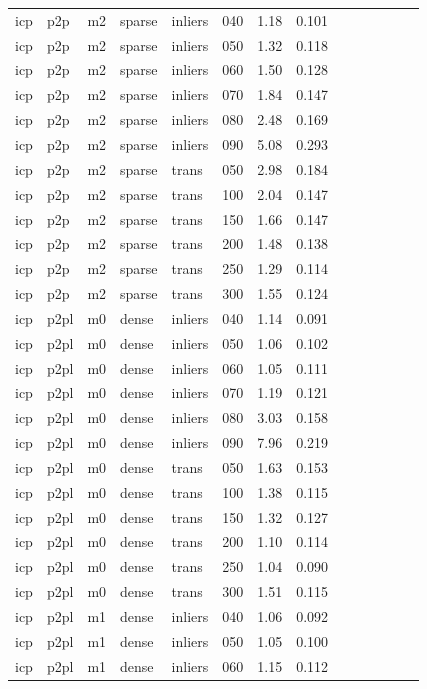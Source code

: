 \begin{table}[htbp]
\begin{tabular}{llllllrrrrrrrr}
  icp & p2p & m2 & sparse & inliers & 040 & 1.18 & 0.101 \\
  icp & p2p & m2 & sparse & inliers & 050 & 1.32 & 0.118 \\
  icp & p2p & m2 & sparse & inliers & 060 & 1.50 & 0.128 \\
  icp & p2p & m2 & sparse & inliers & 070 & 1.84 & 0.147 \\
  icp & p2p & m2 & sparse & inliers & 080 & 2.48 & 0.169 \\
  icp & p2p & m2 & sparse & inliers & 090 & 5.08 & 0.293 \\
  icp & p2p & m2 & sparse & trans & 050 & 2.98 & 0.184 \\
  icp & p2p & m2 & sparse & trans & 100 & 2.04 & 0.147 \\
  icp & p2p & m2 & sparse & trans & 150 & 1.66 & 0.147 \\
  icp & p2p & m2 & sparse & trans & 200 & 1.48 & 0.138 \\
  icp & p2p & m2 & sparse & trans & 250 & 1.29 & 0.114 \\
  icp & p2p & m2 & sparse & trans & 300 & 1.55 & 0.124 \\
  icp & p2pl & m0 & dense & inliers & 040 & 1.14 & 0.091 \\
  icp & p2pl & m0 & dense & inliers & 050 & 1.06 & 0.102 \\
  icp & p2pl & m0 & dense & inliers & 060 & 1.05 & 0.111 \\
  icp & p2pl & m0 & dense & inliers & 070 & 1.19 & 0.121 \\
  icp & p2pl & m0 & dense & inliers & 080 & 3.03 & 0.158 \\
  icp & p2pl & m0 & dense & inliers & 090 & 7.96 & 0.219 \\
  icp & p2pl & m0 & dense & trans & 050 & 1.63 & 0.153 \\
  icp & p2pl & m0 & dense & trans & 100 & 1.38 & 0.115 \\
  icp & p2pl & m0 & dense & trans & 150 & 1.32 & 0.127 \\
  icp & p2pl & m0 & dense & trans & 200 & 1.10 & 0.114 \\
  icp & p2pl & m0 & dense & trans & 250 & 1.04 & 0.090 \\
  icp & p2pl & m0 & dense & trans & 300 & 1.51 & 0.115 \\
  icp & p2pl & m1 & dense & inliers & 040 & 1.06 & 0.092 \\
  icp & p2pl & m1 & dense & inliers & 050 & 1.05 & 0.100 \\
  icp & p2pl & m1 & dense & inliers & 060 & 1.15 & 0.112 \\

\end{tabular}
\end{table}
